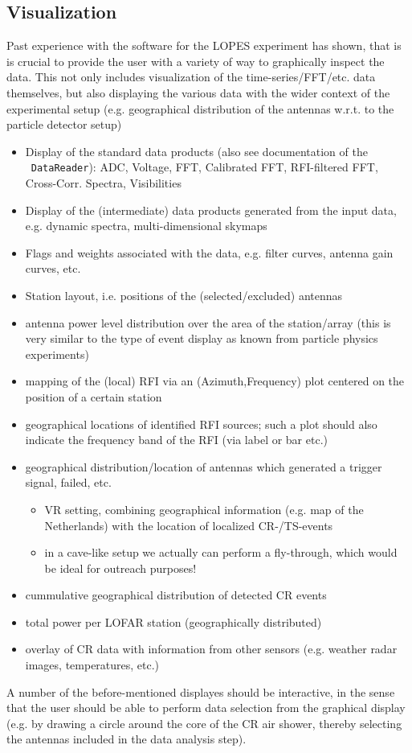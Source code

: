 \documentclass[a4paper,10pt,bibtotoc]{scrartcl}
\begin{document}
\subsection{Visualization}

Past experience with the software for the LOPES experiment has shown, that is
is crucial to provide the user with a variety of way to graphically inspect
the data. This not only includes visualization of the time-series/FFT/etc.
data themselves, but also displaying the various data with the wider context
of the experimental setup (e.g. geographical distribution of the antennas
w.r.t. to the particle detector setup)

\begin{itemize}
\item Display of the standard data products (also see documentation of the
  \lopestools\ \verb|DataReader|): ADC, Voltage, FFT, Calibrated FFT,
  RFI-filtered FFT, Cross-Corr. Spectra, Visibilities
\item Display of the (intermediate) data products generated from the input
  data, e.g. dynamic spectra, multi-dimensional skymaps
\item Flags and weights associated with the data, e.g. filter curves, antenna
  gain curves, etc.
\item Station layout, i.e. positions of the (selected/excluded) antennas
\item antenna power level distribution over the area of the station/array
  (this is very similar to the type of event display as known from particle
  physics experiments)
\item mapping of the (local) RFI via an (Azimuth,Frequency) plot centered on
  the position of a certain station
\item geographical locations of identified RFI sources; such a plot should
  also indicate the  frequency band of the RFI (via label or bar etc.)
\item geographical distribution/location of antennas which generated a trigger
  signal, failed, etc.
  \begin{itemize}
  \item[$\rightarrow$] VR setting, combining geographical information (e.g.
    map of the Netherlands) with the location of localized CR-/TS-events
  \item[$\Rightarrow$] in a cave-like setup we actually can perform a
  fly-through, which would be ideal for outreach purposes!
  \end{itemize}
\item cummulative geographical distribution of detected CR events
\item total power per LOFAR station (geographically distributed)
\item overlay of CR data with information from other sensors (e.g. weather
  radar images, temperatures, etc.)
\end{itemize}
A number of the before-mentioned displayes should be interactive, in the sense
that the user should be able to perform data selection from the graphical
display (e.g. by drawing a circle around the core of the CR air shower,
thereby selecting the antennas included in the data analysis step).
\end{document}
